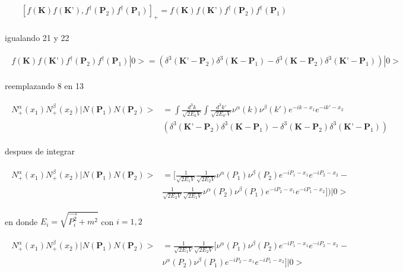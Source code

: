 \begin{gather}
\begin{split}
[f(\textbf{K})f(\textbf{K'}),f^{\dagger}(\textbf{P}_2)f^{\dagger}(\textbf{P}_1)]_{+}=f(\textbf{K})f(\textbf{K'})f^{\dagger}(\textbf{P}_2)f^{\dagger}(\textbf{P}_1)
\end{split}
\end{gather}

igualando 21 y 22

\begin{gather}
\begin{split}
f(\textbf{K})f(\textbf{K'})f^{\dagger}(\textbf{P}_2)f^{\dagger}(\textbf{P}_1)|0>=(\delta^{3}(\textbf{K'}-\textbf{P}_2)\delta^{3}(\textbf{K}-\textbf{P}_1)-\delta^{3}(\textbf{K}-\textbf{P}_2)\delta^{3}(\textbf{K'}-\textbf{P}_1))|0>
\end{split}
\end{gather}

reemplazando 8 en 13

\begin{gather}
\begin{split}
{N}^{\alpha}_{+}(x_1){N}^{\beta}_{+}(x_2)|{N}(\textbf{P}_1){N}(\textbf{P}_2)>&=\int \frac{{d}^{3}k}{\sqrt{2E_{k}V}}\int \frac{{d}^{3}k'}{\sqrt{2E_{k'}V}}\nu^{\alpha}(k)\nu^{\beta}(k')e^{-ik-x_{1}}e^{-ik'-x_{2}}\\&(\delta^{3}(\textbf{K'}-\textbf{P}_2)\delta^{3}(\textbf{K}-\textbf{P}_1)-\delta^{3}(\textbf{K}-\textbf{P}_2)\delta^{3}(\textbf{K'}-\textbf{P}_1))
\end{split}
\end{gather}

despues de integrar 

\begin{gather}
\begin{split}
{N}^{\alpha}_{+}(x_1){N}^{\beta}_{+}(x_2)|{N}(\textbf{P}_1){N}(\textbf{P}_2)>&=[\frac{1}{\sqrt{2E_{1}V}}\frac{1}{\sqrt{2E_{2}V}}\nu^{\alpha}({P}_1)\nu^{\beta}({P}_{2})e^{-i{P}_{1}-x_{1}}e^{-iP_{2}-x_{2}}-\\& \frac{1}{\sqrt{2E_{2}V}}\frac{1}{\sqrt{2E_{1}V}}\nu^{\alpha}({P}_2)\nu^{\beta}({P}_{1})e^{-i{P}_{2}-x_{1}}e^{-iP_{1}-x_{2}}])|0>
\end{split}
\end{gather}

en donde $E_{i}=\sqrt{\vec{P_i^2}+m^2}$ con $i=1,2$

\begin{gather}
\begin{split}
{N}^{\alpha}_{+}(x_1){N}^{\beta}_{+}(x_2)|{N}(\textbf{P}_1){N}(\textbf{P}_2)>&=\frac{1}{\sqrt{2E_{1}V}}\frac{1}{\sqrt{2E_{2}V}}[\nu^{\alpha}({P}_1)\nu^{\beta}({P}_2)e^{-i{P}_{1}-x_{1}}e^{-iP_{2}-x_{2}}-\\&\nu^{\alpha}({P}_2)\nu^{\beta}({P}_1)e^{-i{P}_{2}-x_{1}}e^{-iP_{1}-x_{2}}]|0>
\end{split}
\end{gather}

